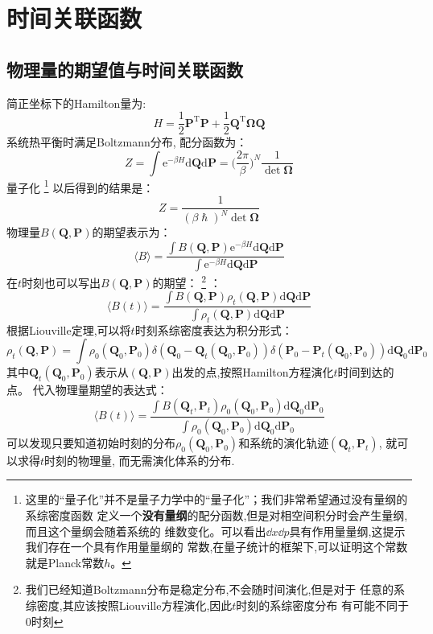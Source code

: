 \chapter{时间关联函数}
    \section{物理量的期望值与时间关联函数}

    简正坐标下的Hamilton量为:
    \begin{equation}
        H = \frac 12 \bm{P}^\mathrm{T}\bm{P} + \frac 12 \bm{Q}^\mathrm{T} \bm{\Omega Q}
    \end{equation}
    系统热平衡时满足Boltzmann分布, 配分函数为：
    \begin{equation}
        Z = \int \mathrm{e}^{-\beta H} \mathrm{d}\bm{Q}\mathrm{d}\bm{P} = \bigg(\frac {2\pi}{\beta}\bigg)^N \frac 1{\det \bm{\Omega}}
    \end{equation}
    量子化
    \footnote{
        这里的“量子化”并不是量子力学中的“量子化”；我们非常希望通过没有量纲的系综密度函数
        定义一个\textbf{没有量纲}的配分函数,但是对相空间积分时会产生量纲,而且这个量纲会随着系统的
        维数变化。可以看出$\dd x\dd p$具有作用量量纲,这提示我们存在一个具有作用量量纲的
        常数,在量子统计的框架下,可以证明这个常数就是Planck常数$h$。
    }
    以后得到的结果是：
    \begin{equation}
        Z = \frac 1{(\beta \hslash)^N \det \bm{\Omega}}
    \end{equation}
    物理量$B(\bm{Q}, \bm{P})$的期望表示为：
    \begin{equation}
        \langle B \rangle = \frac {\int B(\bm{Q,P})\mathrm{e}^{-\beta H} \mathrm{d}\bm{Q}\mathrm{d}\bm{P}}{\int \mathrm{e}^{-\beta H} \mathrm{d}\bm{Q}\mathrm{d}\bm{P}}
    \end{equation}
    在$t$时刻也可以写出$B(\bm{Q}, \bm{P})$的期望：
    \footnote{我们已经知道Boltzmann分布是稳定分布,不会随时间演化,但是对于
    任意的系综密度,其应该按照Liouville方程演化,因此$t$时刻的系综密度分布
    有可能不同于0时刻}
    ：
    \begin{equation}
        \langle B(t) \rangle = \frac {\int B(\bm{Q,P}) \rho_t(\bm{Q,P}) \mathrm{d}\bm{Q}\mathrm{d}\bm{P}}{\int \rho_t(\bm{Q,P}) \mathrm{d}\bm{Q}\mathrm{d}\bm{P}}
    \end{equation}
    根据Liouville定理,可以将$t$时刻系综密度表达为积分形式：
    \begin{equation}
        \rho_t (\bm{Q,P}) = \int \rho_0(\bm{Q}_0, \bm{P}_0)\delta(\bm{Q}_0-\bm{Q}_t(\bm{Q}_0, \bm{P}_0)) \delta(\bm{P}_0-\bm{P}_t(\bm{Q}_0, \bm{P}_0)) \mathrm{d}\bm{Q}_0\mathrm{d}\bm{P}_0
    \end{equation}
    其中$\bm{Q}_t(\bm{Q}_0, \bm{P}_0)$表示从$(\bm{Q}, \bm{P})$出发的点,按照Hamilton方程演化$t$时间到达的点。
    代入物理量期望的表达式：
    \begin{equation}
        \langle B(t) \rangle = \frac {\int B(\bm{Q}_t,\bm{P}_t) \rho_0(\bm{Q}_0,\bm{P}_0) \mathrm{d}\bm{Q}_0\mathrm{d}\bm{P}_0}{\int \rho_0(\bm{Q}_0,\bm{P}_0) \mathrm{d}\bm{Q}_0\mathrm{d}\bm{P}_0}
    \end{equation}
    可以发现只要知道初始时刻的分布$\rho_0(\bm{Q}_0,\bm{P}_0)$和系统的演化轨迹$(\bm{Q}_t,\bm{P}_t)$, 就可以求得$t$时刻的物理量, 而无需演化体系的分布. 

